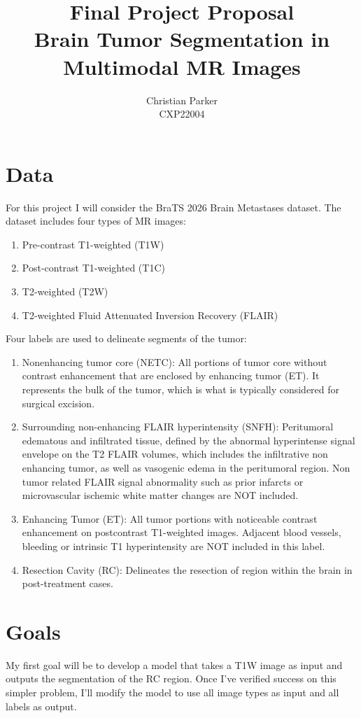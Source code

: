 \documentclass{article}
\title{Final Project Proposal \\ \Large Brain Tumor Segmentation in Multimodal MR Images}
\author{Christian Parker \\ CXP22004}
\begin{document}
\maketitle

\section*{Data}
For this project I will consider the BraTS 2026 Brain Metastases dataset.
The dataset includes four types of MR images:

\begin{enumerate}
    \item
        Pre-contrast T1-weighted (T1W)
    \item
        Post-contrast T1-weighted (T1C)
    \item
        T2-weighted (T2W)
    \item
        T2-weighted Fluid Attenuated Inversion Recovery (FLAIR)
\end{enumerate}

Four labels are used to delineate segments of the tumor:

\begin{enumerate}
    \item
    Nonenhancing tumor core (NETC): All portions of tumor core without contrast enhancement that are enclosed by enhancing tumor (ET). It represents the bulk of the tumor, which is what is typically considered for surgical excision.
    \item
    Surrounding non-enhancing FLAIR hyperintensity (SNFH): Peritumoral edematous and infiltrated tissue, defined by the abnormal hyperintense signal envelope on the T2 FLAIR volumes, which includes the infiltrative non enhancing tumor, as well as vasogenic edema in the peritumoral region. Non tumor related FLAIR signal abnormality such as prior infarcts or microvascular ischemic white matter changes are NOT included.
    \item
    Enhancing Tumor (ET): All tumor portions with noticeable contrast enhancement on postcontrast T1-weighted images. Adjacent blood vessels, bleeding or intrinsic T1 hyperintensity are NOT included in this label.
    \item
    Resection Cavity (RC): Delineates the resection of region within the brain in post-treatment cases. \cite{bratsmets2026task1}
\end{enumerate}

\section*{Goals}
My first goal will be to develop a model that takes a T1W image as input and outputs
the segmentation of the RC region.
Once I've verified success on this simpler problem,
I'll modify the model to use all image types as input and all labels as output.
\end{document}
